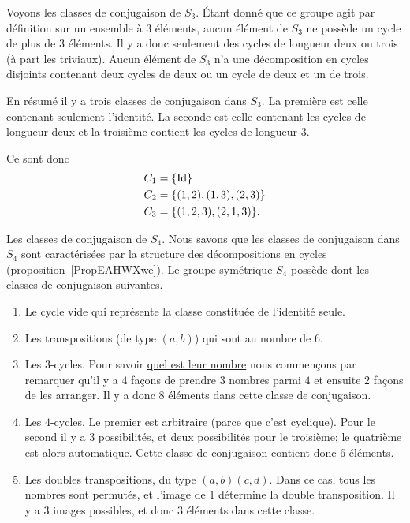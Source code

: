 \begin{example}     \label{EXooQAXRooBsPURs}
    Voyons les classes de conjugaison de \( S_3\). Étant donné que ce groupe agit par définition sur un ensemble à \( 3\) éléments, aucun élément de \( S_3\) ne possède un cycle de plus de \( 3\) éléments. Il y a donc seulement des cycles de longueur deux ou trois (à part les triviaux). Aucun élément de \( S_3\) n'a une décomposition en cycles disjoints contenant deux cycles de deux ou un cycle de deux et un de trois.

    En résumé il y a trois classes de conjugaison dans \( S_3\). La première est celle contenant seulement l'identité. La seconde est celle contenant les cycles de longueur deux et la troisième contient les cycles de longueur \( 3\).

    Ce sont donc
    \begin{subequations}
        \begin{align}
            C_1&=\{ \operatorname{Id} \}\\
            C_2&=\{ (1,2),(1,3),(2,3) \}\\
            C_3&=\{ (1,2,3),(2,1,3) \}.
        \end{align}
    \end{subequations}
\end{example}

\begin{example} \label{ExVYZPzub}
    Les classes de conjugaison de \( S_4\). Nous savons que les classes de conjugaison dans \( S_4\) sont caractérisées par la structure des décompositions en cycles (proposition~\ref{PropEAHWXwe}). Le groupe symétrique \( S_4\) possède dont les classes de conjugaison suivantes.
\begin{enumerate}
    \item
        Le cycle vide qui représente la classe constituée de l'identité seule.
    \item
        Les transpositions (de type \( (a,b)\)) qui sont au nombre de \( 6\).
    \item
        Les \( 3\)-cycles. Pour savoir \href{http://www.toujourspret.com/techniques/expression/chants/C/cantique_des_etoiles.php}{quel est leur nombre} nous commençons par remarquer qu'il y a \( 4\) façons de prendre \( 3\) nombres parmi \( 4\) et ensuite \( 2\) façons de les arranger. Il y a donc \( 8\) éléments dans cette classe de conjugaison.
    \item
        Les \( 4\)-cycles. Le premier est arbitraire (parce que c'est cyclique). Pour le second il y a \( 3\) possibilités, et deux possibilités pour le troisième; le quatrième est alors automatique. Cette classe de conjugaison contient donc \( 6\) éléments.
    \item       \label{ITEMooGCMYooKZgFHX}
        Les doubles transpositions, du type \( (a,b)(c,d)\). Dans ce cas, tous les nombres sont permutés, et l'image de $1$ détermine la double transposition. Il y a $3$ images possibles, et donc \( 3\) éléments dans cette classe.
\end{enumerate}
\end{example}

